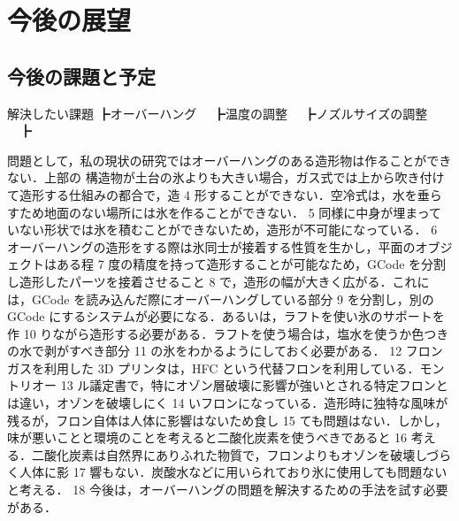 \chapter{今後の展望}
\label{chp:first}

\section{今後の課題と予定}
\label{sec:paragraph}



解決したい課題
┣オーバーハング
　┣温度の調整
　┣ノズルサイズの調整
　┣




問題として，私の現状の研究ではオーバーハングのある造形物は作ることができない．上部の
構造物が土台の氷よりも大きい場合，ガス式では上から吹き付けて造形する仕組みの都合で，造
4 形することができない．空冷式は，水を垂らすため地面のない場所には氷を作ることができない．
5 同様に中身が埋まっていない形状では氷を積むことができないため，造形が不可能になっている．
6 オーバーハングの造形をする際は氷同士が接着する性質を生かし，平面のオブジェクトはある程
7 度の精度を持って造形することが可能なため，GCode を分割し造形したパーツを接着させること
8 で，造形の幅が大きく広がる．これには，GCode を読み込んだ際にオーバーハングしている部分
9 を分割し，別の GCode にするシステムが必要になる．あるいは，ラフトを使い氷のサポートを作
10 りながら造形する必要がある．ラフトを使う場合は，塩水を使うか色つきの水で剥がすべき部分
11 の氷をわかるようにしておく必要がある．
12 フロンガスを利用した 3D プリンタは，HFC という代替フロンを利用している．モントリオー
13 ル議定書で，特にオゾン層破壊に影響が強いとされる特定フロンとは違い，オゾンを破壊しにく
14 いフロンになっている．造形時に独特な風味が残るが，フロン自体は人体に影響はないため食し
15 ても問題はない．しかし，味が悪いことと環境のことを考えると二酸化炭素を使うべきであると
16 考える．二酸化炭素は自然界にありふれた物質で，フロンよりもオゾンを破壊しづらく人体に影
17 響もない．炭酸水などに用いられており氷に使用しても問題ないと考える．
18 今後は，オーバーハングの問題を解決するための手法を試す必要がある．